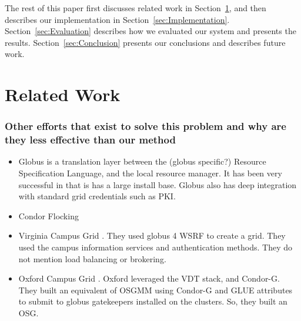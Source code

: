 \documentclass[11pt]{article}
\newcommand{\secref}[1]{Section~\ref{#1}}
\begin{document}
The rest of this paper first discusses related work in
\secref{sec:RelatedWork}, and then describes our implementation in
\secref{sec:Implementation}. \secref{sec:Evaluation} describes how we evaluated
our system and presents the results. \secref{sec:Conclusion} presents our
conclusions and describes future work.


\section{Related Work}
\label{sec:RelatedWork}

\subsubsection*{Other efforts that exist to solve this problem and why are they
less effective than our method}

\begin{itemize}
\item
Globus is a translation layer between the (globus specific?) Resource Specification Language, and the local resource manager.  It has been very successful in that is has a large install base.  Globus also has deep integration with standard grid credentials such as PKI.

\item
Condor Flocking

\item
Virginia Campus Grid \cite{humphrey2005university}.  They used globus 4 WSRF to create a grid.  They used the campus information services and authentication methods.  They do not mention load balancing or brokering.

\item
Oxford Campus Grid \cite{wallom2006oxgrid}.  Oxford leveraged the VDT stack, and Condor-G.  They built an equivalent of OSGMM using Condor-G and GLUE attributes to submit to globus gatekeepers installed on the clusters.  So, they built an OSG.



\end{itemize}
\end{document}
